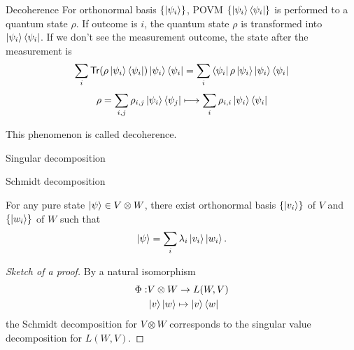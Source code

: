 \documentclass[10pt]{beamer}
\newcommand{\Tr}{\mathsf{Tr}}
\newcommand\emm[1]{\textcolor{redorange}{{#1}}}
\begin{document}

\begin{frame}{Decoherence}
For orthonormal basis $\{\ket{\psi_i}\}$, POVM $\{\ket{\psi_i}\bra{\psi_i}\}$ is performed to a quantum state $\rho$.
If outcome is $i$, the quantum state $\rho$ is \emm{transformed} into $\ket{\psi_i}\bra{\psi_i}$.
If we \emm{don't see} the measurement outcome, the state after the measurement is
\begin{align*}
\sum_i \Tr(\rho \ket{\psi_i}\bra{\psi_i})\ket{\psi_i}\bra{\psi_i}
=
\sum_i \bra{\psi_i}\rho\ket{\psi_i}\ket{\psi_i}\bra{\psi_i}
\end{align*}
\begin{align*}
\rho=\sum_{i,j}\rho_{i,j}\ket{\psi_i}\bra{\psi_j}
\longmapsto
\sum_{i}\rho_{i,i}\ket{\psi_i}\bra{\psi_i}
\end{align*}

\vspace{2em}
This phenomenon is called \emm{decoherence}.
\end{frame}

\begin{frame}{Singular decomposition}
\end{frame}

\begin{frame}{Schmidt decomposition}
\begin{theorem}
For any pure state $\ket{\psi}\in V\otimes W$, there exist orthonormal basis $\{\ket{v_i}\}$ of $V$ and $\{\ket{w_i}\}$ of $W$ such that
\begin{equation*}
\ket{\psi}=\sum_i\lambda_i \ket{v_i}\ket{w_i}.
\end{equation*}
\end{theorem}
\begin{proof}[Sketch of a proof]
By a natural isomorphism
\begin{align*}
\Phi:& V\otimes W \to L(W,V)\\
&\ket{v}\ket{w}\mapsto \ket{v}\bra{w}
\end{align*}
the Schmidt decomposition for $V\otimes W$ corresponds to the singular value decomposition for $L(W, V)$.
\end{proof}
\end{frame}
\fi
\end{document}
